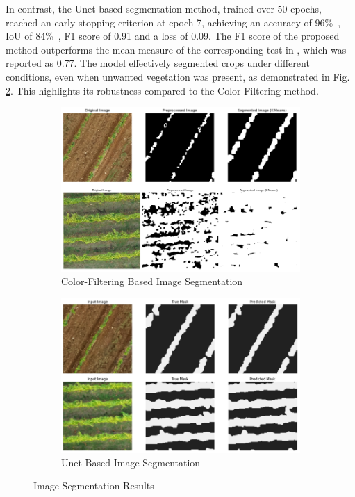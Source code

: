 \documentclass[conference]{IEEEtran}
\begin{document}
	
	In contrast, the Unet-based segmentation method, trained over 50 epochs, reached an early stopping criterion at epoch 7, achieving an accuracy of 96\%\ , IoU of 84\%\ , F1 score of 0.91 and a loss of 0.09. The F1 score of the proposed method outperforms the mean measure of the corresponding test in \cite{b5}, which was reported as 0.77. The model effectively segmented crops under different conditions, even when unwanted vegetation was present, as demonstrated in Fig.
	\ref{fig2:Unet_Segmentation}.
	This highlights its robustness compared to the Color-Filtering method.
	
	\begin{figure}[t]
		\begin{subfigure}{\linewidth}
			\centering
			\includegraphics[width=0.7\linewidth]{kmeans_predictions.png}
			\caption{Color-Filtering Based Image Segmentation}
			\label{fig2:kmeans}
		\end{subfigure}
		
		\vspace{0.5cm}
		
		\begin{subfigure}{\linewidth}
			\centering
			\includegraphics[width=0.7\linewidth]{unet_predictions.png}
			\caption{Unet-Based Image Segmentation}
			\label{fig2:Unet_Segmentation}
		\end{subfigure}
		
		\caption{Image Segmentation Results \cite{b5}}
		\label{fig:Image_Segmentation_Results}
	\end{figure}
	
\end{document}
